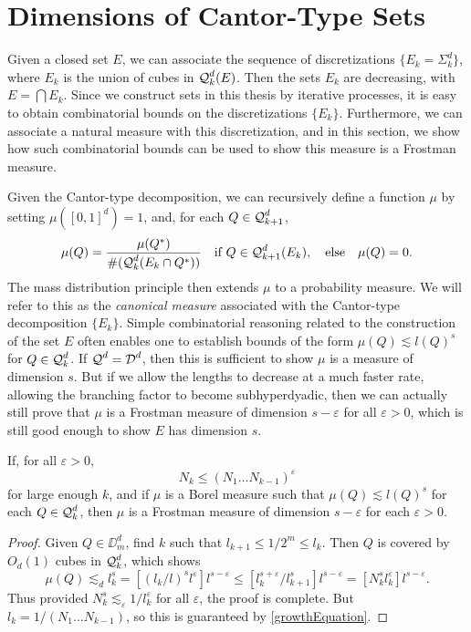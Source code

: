 \section{Dimensions of Cantor-Type Sets}

Given a closed set $E$, we can associate the sequence of discretizations $\{ E_k = \Sigma_k^d \}$, where $E_k$ is the union of cubes in $\operatorname{\mathcal{Q}}^d_k(E)$. Then the sets $E_k$ are decreasing, with $E = \bigcap E_k$. Since we construct sets in this thesis by iterative processes, it is easy to obtain combinatorial bounds on the discretizations $\{ E_k \}$. Furthermore, we can associate a natural measure with this discretization, and in this section, we show how such combinatorial bounds can be used to show this measure is a Frostman measure.

Given the Cantor-type decomposition, we can recursively define a function $\mu$ by setting $\mu([0,1]^d) = 1$, and, for each $Q \in \operatorname{\mathcal{Q}}_{k+1}^d$,
%
\[ \mu(Q) = \frac{\mu(Q^*)}{\# (\operatorname{\mathcal{Q}}_k^d(E_k \cap Q^*))}\quad \text{if}\ Q \in \operatorname{\mathcal{Q}}_{k+1}^d(E_k),\quad \text{else} \quad \mu(Q) = 0. \]
%
The mass distribution principle then extends $\mu$ to a probability measure. We will refer to this as the \emph{canonical measure} associated with the Cantor-type decomposition $\{ E_k \}$. Simple combinatorial reasoning related to the construction of the set $E$ often enables one to establish bounds of the form $\mu(Q) \lesssim l(Q)^s$ for $Q \in \operatorname{\mathcal{Q}}_k^d$. If $\operatorname{\mathcal{Q}}^d = \operatorname{\mathcal{D}}^d$, then this is sufficient to show $\mu$ is a measure of dimension $s$. But if we allow the lengths to decrease at a much faster rate, allowing the branching factor to become subhyperdyadic, then we can actually still prove that $\mu$ is a Frostman measure of dimension $s - \varepsilon$ for all $\varepsilon > 0$, which is still good enough to show $E$ has dimension $s$.

\begin{theorem} \label{easyCoverTheorem}
	If, for all $\varepsilon > 0$,
	\begin{equation} \label{growthEquation} N_k \leq (N_1 \dots N_{k-1})^\varepsilon \end{equation}
	for large enough $k$, and if $\mu$ is a Borel measure such that $\mu(Q) \lesssim l(Q)^s$ for each $Q \in \operatorname{\mathcal{Q}}_k^d$, then $\mu$ is a Frostman measure of dimension $s - \varepsilon$ for each $\varepsilon > 0$.
\end{theorem}
\begin{proof}
	Given $Q \in \DD^d_m$, find $k$ such that $l_{k+1} \leq 1/2^m \leq l_k$. Then $Q$ is covered by $O_d(1)$ cubes in $\operatorname{\mathcal{Q}}^d_k$, which shows
	\[ \mu(Q) \lesssim_d l_k^s = [(l_k/l)^s l^\varepsilon ] l^{s - \varepsilon} \leq [l_k^{s + \varepsilon} / l_{k+1}^s] l^{s - \varepsilon} = [N_k^s l_k^\varepsilon] l^{s-\varepsilon}. \]
	Thus provided $N_k^s \lesssim_\varepsilon 1/l_k^\varepsilon$ for all $\varepsilon$, the proof is complete. But $l_k = 1/(N_1 \dots N_{k-1})$, so this is guaranteed by \eqref{growthEquation}.
\end{proof}

